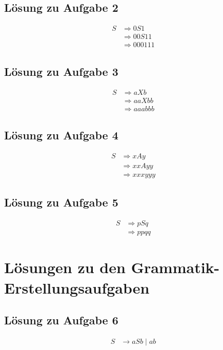 \documentclass[a4paper,12pt]{article}
\begin{document}
	\subsection*{Lösung zu Aufgabe 2}
	\begin{align*}
		S &\Rightarrow 0 S 1 \\
		&\Rightarrow 0 0 S 1 1 \\
		&\Rightarrow 0 0 0 1 1 1
	\end{align*}
	
	\subsection*{Lösung zu Aufgabe 3}
	\begin{align*}
		S &\Rightarrow a X b \\
		&\Rightarrow a a X b b \\
		&\Rightarrow a a a b b b
	\end{align*}
	
	\subsection*{Lösung zu Aufgabe 4}
	\begin{align*}
		S &\Rightarrow x A y \\
		&\Rightarrow x x A y y \\
		&\Rightarrow x x x y y y
	\end{align*}
	
	\subsection*{Lösung zu Aufgabe 5}
	\begin{align*}
		S &\Rightarrow p S q \\
		&\Rightarrow p p q q
	\end{align*}
	
	\newpage
	\section*{Lösungen zu den Grammatik-Erstellungsaufgaben}
	
	\subsection*{Lösung zu Aufgabe 6}
	\begin{align*}
		S &\rightarrow a S b \mid ab
	\end{align*}
	
\end{document}
